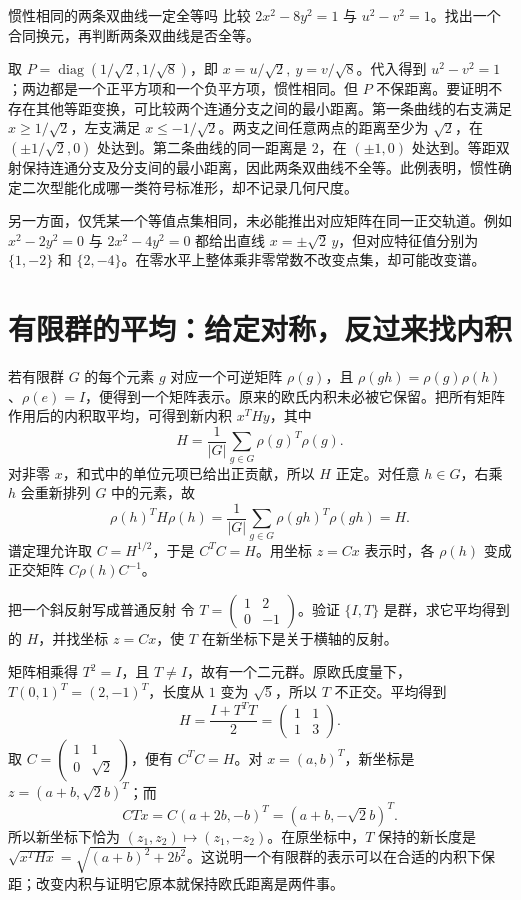 \begin{example}{惯性相同的两条双曲线一定全等吗}
比较 $2x^2-8y^2=1$ 与 $u^2-v^2=1$。找出一个合同换元，再判断两条双曲线是否全等。
\end{example}
\begin{solution}
取 $P=\operatorname{diag}(1/\sqrt2,1/\sqrt8)$，即 $x=u/\sqrt2,\ y=v/\sqrt8$。代入得到 $u^2-v^2=1$；两边都是一个正平方项和一个负平方项，惯性相同。但 $P$ 不保距离。要证明不存在其他等距变换，可比较两个连通分支之间的最小距离。第一条曲线的右支满足 $x\ge1/\sqrt2$，左支满足 $x\le-1/\sqrt2$。两支之间任意两点的距离至少为 $\sqrt2$，在 $(\pm1/\sqrt2,0)$ 处达到。第二条曲线的同一距离是 $2$，在 $(\pm1,0)$ 处达到。等距双射保持连通分支及分支间的最小距离，因此两条双曲线不全等。此例表明，惯性确定二次型能化成哪一类符号标准形，却不记录几何尺度。
\end{solution}

另一方面，仅凭某一个等值点集相同，未必能推出对应矩阵在同一正交轨道。例如 \(x^2-2y^2=0\) 与 \(2x^2-4y^2=0\) 都给出直线 \(x=\pm\sqrt2\,y\)，但对应特征值分别为 \(\{1,-2\}\) 和 \(\{2,-4\}\)。在零水平上整体乘非零常数不改变点集，却可能改变谱。

\section{有限群的平均：给定对称，反过来找内积}
若有限群 \(G\) 的每个元素 \(g\) 对应一个可逆矩阵 \(\rho(g)\)，且 \(\rho(gh)=\rho(g)\rho(h)\)、\(\rho(e)=I\)，便得到一个矩阵表示。原来的欧氏内积未必被它保留。把所有矩阵作用后的内积取平均，可得到新内积 \(x^THy\)，其中
\[
 H=\frac{1}{|G|}\sum_{g\in G}\rho(g)^T\rho(g).
\]
对非零 \(x\)，和式中的单位元项已给出正贡献，所以 \(H\) 正定。对任意 \(h\in G\)，右乘 \(h\) 会重新排列 \(G\) 中的元素，故
\[
 \rho(h)^T H\rho(h)
 =\frac1{|G|}\sum_{g\in G}\rho(gh)^T\rho(gh)=H.
\]
谱定理允许取 \(C=H^{1/2}\)，于是 \(C^TC=H\)。用坐标 \(z=Cx\) 表示时，各 \(\rho(h)\) 变成正交矩阵 \(C\rho(h)C^{-1}\)。

\begin{example}{把一个斜反射写成普通反射}
令 \(T=\begin{pmatrix}1&2\\0&-1\end{pmatrix}\)。验证 \(\{I,T\}\) 是群，求它平均得到的 \(H\)，并找坐标 \(z=Cx\)，使 \(T\) 在新坐标下是关于横轴的反射。
\end{example}
\begin{solution}
矩阵相乘得 \(T^2=I\)，且 \(T\ne I\)，故有一个二元群。原欧氏度量下，\(T(0,1)^T=(2,-1)^T\)，长度从 \(1\) 变为 \(\sqrt5\)，所以 \(T\) 不正交。平均得到
\[
 H=\frac{I+T^TT}{2}
  =\begin{pmatrix}1&1\\1&3\end{pmatrix}.
\]
取 \(C=\begin{pmatrix}1&1\\0&\sqrt2\end{pmatrix}\)，便有 \(C^TC=H\)。对 \(x=(a,b)^T\)，新坐标是 \(z=(a+b,\sqrt2 b)^T\)；而
\[
 CTx=C(a+2b,-b)^T=(a+b,-\sqrt2 b)^T.
\]
所以新坐标下恰为 \((z_1,z_2)\mapsto(z_1,-z_2)\)。在原坐标中，\(T\) 保持的新长度是 \(\sqrt{x^THx}=\sqrt{(a+b)^2+2b^2}\)。这说明一个有限群的表示可以在合适的内积下保距；改变内积与证明它原本就保持欧氏距离是两件事。
\end{solution}
